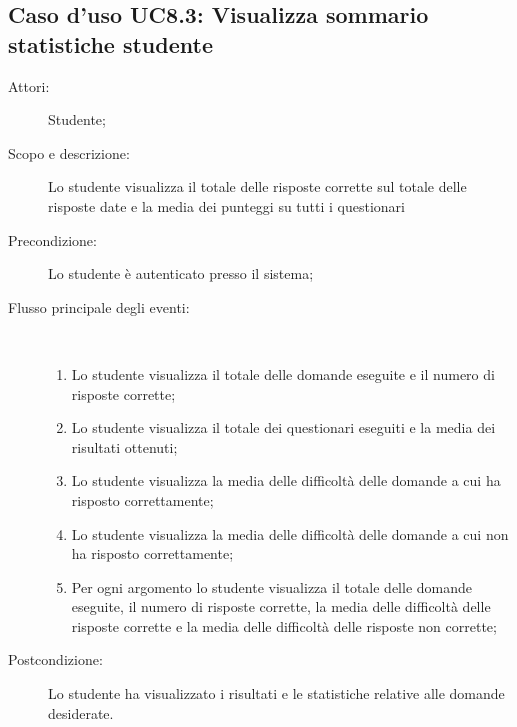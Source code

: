 \subsection{Caso d'uso UC8.3: Visualizza sommario statistiche studente}\begin{description}
	\item[Attori:] Studente;
	\item[Scopo e descrizione:] Lo studente visualizza il totale delle risposte corrette sul totale delle risposte date e la media dei punteggi su tutti i questionari
	\item[Precondizione:] Lo studente è autenticato presso il sistema;
	
	\item[Flusso principale degli eventi:] \ 
	\begin{enumerate}
		\item Lo studente visualizza il totale delle domande eseguite e il numero di risposte corrette;
		\item Lo studente visualizza il totale dei questionari eseguiti e la media dei risultati ottenuti;
		\item Lo studente visualizza la media delle difficoltà delle domande a cui ha risposto correttamente;
		\item Lo studente visualizza la media delle difficoltà delle domande a cui non ha risposto correttamente;
		\item Per ogni argomento lo studente visualizza il totale delle domande eseguite, il numero di risposte corrette, la media delle difficoltà delle risposte corrette e la media delle difficoltà delle risposte non corrette;
		
	\end{enumerate}
	\item[Postcondizione:] Lo studente ha visualizzato i risultati e le statistiche relative alle domande desiderate.
\end{description}
\hypertarget{UC9}{}
